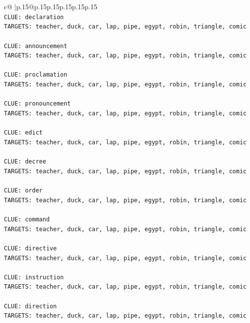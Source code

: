 \documentclass{article}
\begin{document}
{\begin{supertabular}{c@{$\;$}|p{.15\linewidth}@{}p{.15\linewidth}p{.15\linewidth}p{.15\linewidth}p{.15\linewidth}p{.15\linewidth}}
{{{\\ 
\texttt{CLUE: declaration} \\
\texttt{TARGETS: teacher, duck, car, lap, pipe, egypt, robin, triangle, comic} \\
\\ 
\texttt{CLUE: announcement} \\
\texttt{TARGETS: teacher, duck, car, lap, pipe, egypt, robin, triangle, comic} \\
\\ 
\texttt{CLUE: proclamation} \\
\texttt{TARGETS: teacher, duck, car, lap, pipe, egypt, robin, triangle, comic} \\
\\ 
\texttt{CLUE: pronouncement} \\
\texttt{TARGETS: teacher, duck, car, lap, pipe, egypt, robin, triangle, comic} \\
\\ 
\texttt{CLUE: edict} \\
\texttt{TARGETS: teacher, duck, car, lap, pipe, egypt, robin, triangle, comic} \\
\\ 
\texttt{CLUE: decree} \\
\texttt{TARGETS: teacher, duck, car, lap, pipe, egypt, robin, triangle, comic} \\
\\ 
\texttt{CLUE: order} \\
\texttt{TARGETS: teacher, duck, car, lap, pipe, egypt, robin, triangle, comic} \\
\\ 
\texttt{CLUE: command} \\
\texttt{TARGETS: teacher, duck, car, lap, pipe, egypt, robin, triangle, comic} \\
\\ 
\texttt{CLUE: directive} \\
\texttt{TARGETS: teacher, duck, car, lap, pipe, egypt, robin, triangle, comic} \\
\\ 
\texttt{CLUE: instruction} \\
\texttt{TARGETS: teacher, duck, car, lap, pipe, egypt, robin, triangle, comic} \\
\\ 
\texttt{CLUE: direction} \\
\texttt{TARGETS: teacher, duck, car, lap, pipe, egypt, robin, triangle, comic} \\
\\ 
}}}
\end{supertabular}}
\end{document}
